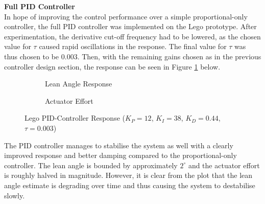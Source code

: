 \textbf{Full PID Controller} \\
In hope of improving the control performance over a simple proportional-only controller, the full PID controller was implemented on the Lego prototype. After experimentation, the derivative cut-off frequency had to be lowered, as the chosen value for $\tau$ caused rapid oscillations in the response. The final value for $\tau$ was thus chosen to be $0.003$. Then, with the remaining gains chosen as in the previous controller design section, the response can be seen in Figure \ref{fig:LegoPIDController} below.

\begin{figure}[H]
	\begin{subfigure}{0.5\textwidth}
	\caption{Lean Angle Response}
	\end{subfigure} \hspace{1mm}
	\begin{subfigure}{0.5\textwidth}
	\caption{Actuator Effort}
	\end{subfigure}
	\caption{Lego PID-Controller Response ($K_P=12$, $K_I=38$, $K_D=0.44$, $\tau=0.003$)}
	\label{fig:LegoPIDController}
\end{figure}

The PID controller manages to stabilise the system as well with a clearly improved response and better damping compared to the proportional-only controller. The lean angle is bounded by approximately $2^{\circ}$ and the actuator effort is roughly halved in magnitude. However, it is clear from the plot that the lean angle estimate is degrading over time and thus causing the system to destabilise slowly.

